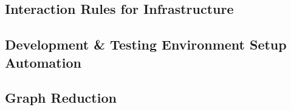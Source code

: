 



\subsection{Interaction Rules for Infrastructure}\label{sec:automation:infra}



\subsection{Development \& Testing Environment Setup Automation}\label{sec:automation:dev_env}



\subsection{Graph Reduction}\label{sec:automation:gen_trans_matrix}




